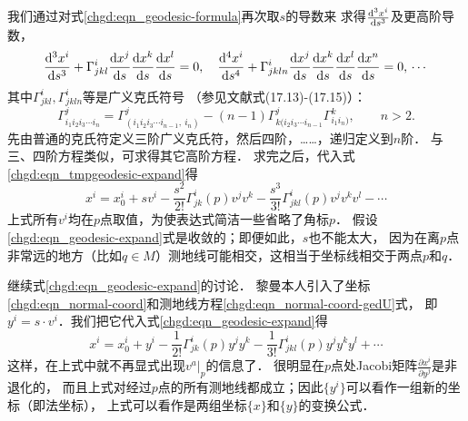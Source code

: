 我们通过对式\eqref{chgd:eqn_geodesic-formula}再次取$s$的导数来
求得$\frac{{\rm d}^3 x^i}{{\rm d} s^3}$及更高阶导数，
\begin{equation}
    \frac{{\rm d}^3 x^i}{{\rm d} s^3}+\Gamma^{i}_{jkl}\frac{{\rm d} x^j}{{\rm d} s}
    \frac{{\rm d} x^k}{{\rm d} s}\frac{{\rm d} x^l}{{\rm d} s} =0 , \quad
    \frac{{\rm d}^4 x^i}{{\rm d} s^4}+\Gamma^{i}_{jkln}\frac{{\rm d} x^j}{{\rm d} s}
    \frac{{\rm d} x^k}{{\rm d} s}\frac{{\rm d} x^l}{{\rm d} s}\frac{{\rm d} x^n}{{\rm d} s} =0,
    \, \cdots
\end{equation}
其中$\Gamma^{i}_{jkl},\Gamma^{i}_{jkln}$等是广义克氏符号
（参见文献\parencite[\S 17]{eisenhart-1997-rg}式(17.13)-(17.15)）：
\begin{equation}\label{chgd:eqn_generalized-Christoffel}
    \Gamma^{j}_{i_1i_2i_3\cdots i_n} =  \Gamma^{j}_{(i_1i_2i_3\cdots i_{n-1},\ i_n)}
    - (n-1) \Gamma^{j}_{k(i_2i_3\cdots i_{n-1}}  \Gamma^{k}_{i_1i_n)},\qquad n>2 .
\end{equation}
先由普通的克氏符定义三阶广义克氏符，然后四阶，……，递归定义到$n$阶．
与三、四阶方程类似，可求得其它高阶方程．
求完之后，代入式\eqref{chgd:eqn_tmpgeodesic-expand}得
\begin{equation}\label{chgd:eqn_geodesic-expand}
    x^i = x^i_0 + s v^i  - \frac{s^2}{2!} \Gamma_{jk}^i(p) v^j v^k
        - \frac{s^3}{3!}  \Gamma^{i}_{jkl}(p) v^j v^k v^l
        - \cdots
\end{equation}
上式所有$v^i$均在$p$点取值，为使表达式简洁一些省略了角标$p$．
假设\eqref{chgd:eqn_geodesic-expand}式是收敛的；即便如此，$s$也不能太大，
因为在离$p$点非常远的地方（比如$q\in M$）测地线可能相交，这相当于坐标线相交于两点$p$和$q$．



继续式\eqref{chgd:eqn_geodesic-expand}的讨论．
黎曼本人引入了坐标\eqref{chgd:eqn_normal-coord}和测地线方程\eqref{chgd:eqn_normal-coord-gedU}式，
即$ y^i = s\cdot v^i$．我们把它代入式\eqref{chgd:eqn_geodesic-expand}得
\begin{equation}
    x^i = x^i_0 + y^i  - \frac{1}{2!} \Gamma_{jk}^i(p) y^j y^k
    - \frac{1}{3!}  \Gamma^{i}_{jkl}(p) y^j y^k y^l + \cdots
\end{equation}
这样，在上式中就不再显式出现$v^a|_p$的信息了．
很明显在$p$点处Jacobi矩阵$\frac{\partial x^i}{\partial y^j}$是非退化的，
而且上式对经过$p$点的所有测地线都成立；因此$\{y^i\}$可以看作一组新的坐标（即法坐标），
上式可以看作是两组坐标$\{x\}$和$\{y\}$的变换公式．

